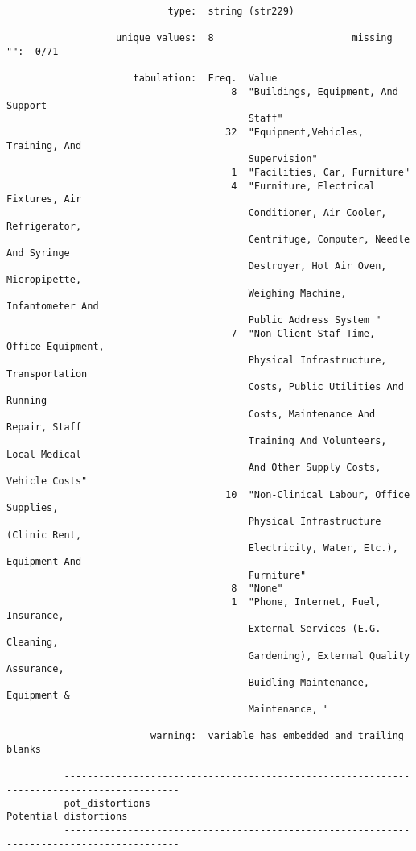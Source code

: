 \documentclass{article}
\begin{document}
\begin{verbatim}
                            type:  string (str229)
          
                   unique values:  8                        missing "":  0/71
          
                      tabulation:  Freq.  Value
                                       8  "Buildings, Equipment, And Support
                                          Staff"
                                      32  "Equipment,Vehicles, Training, And
                                          Supervision"
                                       1  "Facilities, Car, Furniture"
                                       4  "Furniture, Electrical Fixtures, Air
                                          Conditioner, Air Cooler, Refrigerator,
                                          Centrifuge, Computer, Needle And Syringe
                                          Destroyer, Hot Air Oven, Micropipette,
                                          Weighing Machine, Infantometer And
                                          Public Address System "
                                       7  "Non-Client Staf Time, Office Equipment,
                                          Physical Infrastructure, Transportation
                                          Costs, Public Utilities And Running
                                          Costs, Maintenance And Repair, Staff
                                          Training And Volunteers, Local Medical
                                          And Other Supply Costs, Vehicle Costs"
                                      10  "Non-Clinical Labour, Office Supplies,
                                          Physical Infrastructure (Clinic Rent,
                                          Electricity, Water, Etc.), Equipment And
                                          Furniture"
                                       8  "None"
                                       1  "Phone, Internet, Fuel, Insurance,
                                          External Services (E.G. Cleaning,
                                          Gardening), External Quality Assurance,
                                          Buidling Maintenance, Equipment &
                                          Maintenance, "
          
                         warning:  variable has embedded and trailing blanks
          
          ------------------------------------------------------------------------------------------
          pot_distortions                                                      Potential distortions
          ------------------------------------------------------------------------------------------
          

\end{verbatim}
\end{document}
